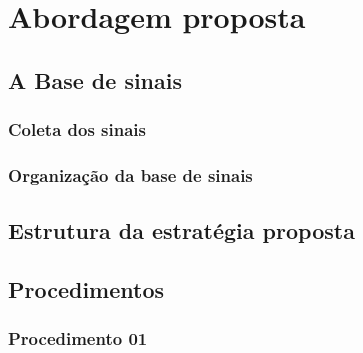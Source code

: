 \chapter{Abordagem proposta} \label{chap:propApproach}
	\section{A Base de sinais}
	    \subsection{Coleta dos sinais}
	    \subsection{Organização da base de sinais}


	\section{Estrutura da estratégia proposta}
	
	\section{Procedimentos}

	\subsection{Procedimento 01}